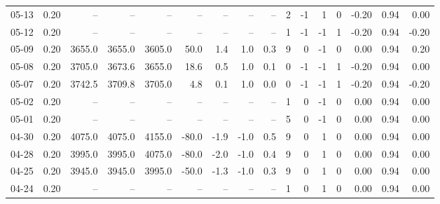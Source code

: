 \begin{threeparttable}
{\begin{tabular}{lrrrrrrrrrrrrrrr}
  05-13 &     0.20 &     -- &     -- &     -- &         -- &             -- &                       -- &                  -- &              2 &        -1 &     1 &         0 &      -0.20 &      0.94 &           0.00 \\
  05-12 &     0.20 &     -- &     -- &     -- &         -- &             -- &                       -- &                  -- &              1 &        -1 &    -1 &         1 &      -0.20 &      0.94 &          -0.20 \\
  05-09 &     0.20 & 3655.0 & 3655.0 & 3605.0 &       50.0 &            1.4 &                      1.0 &                 0.3 &              9 &         0 &    -1 &         0 &       0.00 &      0.94 &           0.20 \\
  05-08 &     0.20 & 3705.0 & 3673.6 & 3655.0 &       18.6 &            0.5 &                      1.0 &                 0.1 &              0 &        -1 &    -1 &         1 &      -0.20 &      0.94 &           0.00 \\
  05-07 &     0.20 & 3742.5 & 3709.8 & 3705.0 &        4.8 &            0.1 &                      1.0 &                 0.0 &              0 &        -1 &    -1 &         1 &      -0.20 &      0.94 &          -0.20 \\
  05-02 &     0.20 &     -- &     -- &     -- &         -- &             -- &                       -- &                  -- &              1 &         0 &    -1 &         0 &       0.00 &      0.94 &           0.00 \\
  05-01 &     0.20 &     -- &     -- &     -- &         -- &             -- &                       -- &                  -- &              5 &         0 &    -1 &         0 &       0.00 &      0.94 &           0.00 \\
  04-30 &     0.20 & 4075.0 & 4075.0 & 4155.0 &      -80.0 &           -1.9 &                     -1.0 &                 0.5 &              9 &         0 &     1 &         0 &       0.00 &      0.94 &           0.00 \\
  04-28 &     0.20 & 3995.0 & 3995.0 & 4075.0 &      -80.0 &           -2.0 &                     -1.0 &                 0.4 &              9 &         0 &     1 &         0 &       0.00 &      0.94 &           0.00 \\
  04-25 &     0.20 & 3945.0 & 3945.0 & 3995.0 &      -50.0 &           -1.3 &                     -1.0 &                 0.3 &              9 &         0 &     1 &         0 &       0.00 &      0.94 &           0.00 \\
  04-24 &     0.20 &     -- &     -- &     -- &         -- &             -- &                       -- &                  -- &              1 &         0 &     1 &         0 &       0.00 &      0.94 &           0.00 \\

\end{tabular}}
\end{threeparttable}
